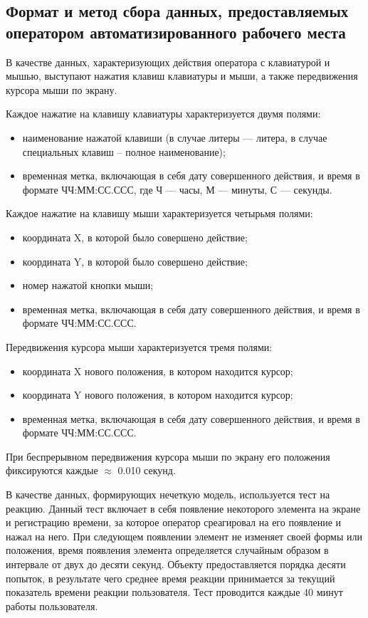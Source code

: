 \subsection{Формат и метод сбора данных, предоставляемых оператором автоматизированного рабочего места}
В качестве данных, характеризующих действия оператора с клавиатурой и мышью, выступают нажатия клавиш клавиатуры и мыши, а также передвижения курсора мыши по экрану.

Каждое нажатие на клавишу клавиатуры характеризуется двумя полями:
\begin{itemize}[leftmargin=1.6\parindent]
\item наименование нажатой клавиши (в случае литеры --- литера, в случае специальных клавиш -- полное наименование);
\item временная метка, включающая в себя дату совершенного действия, и время в формате ЧЧ:ММ:СС.ССС, где Ч --- часы, М --- минуты, С --- секунды.
\end{itemize}

Каждое нажатие на клавишу мыши характеризуется четырьмя полями:
\begin{itemize}[leftmargin=1.6\parindent]
\item координата X, в которой было совершено действие;
\item координата Y, в которой было совершено действие;
\item номер нажатой кнопки мыши;
\item временная метка, включающая в себя дату совершенного действия, и время в формате ЧЧ:ММ:СС.ССС.
\end{itemize}

Передвижения курсора мыши характеризуется тремя полями:
\begin{itemize}[leftmargin=1.6\parindent]
\item координата X нового положения, в котором находится курсор;
\item координата Y нового положения, в котором находится курсор;
\item временная метка, включающая в себя дату совершенного действия, и время в формате ЧЧ:ММ:СС.ССС.
\end{itemize}

При беспрерывном передвижения курсора мыши по экрану его положения фиксируются каждые $\approx$ 0.010 секунд.

В качестве данных, формирующих нечеткую модель, используется тест на реакцию. Данный тест включает в себя появление некоторого элемента на экране и регистрацию времени, за которое оператор среагировал на его появление и нажал на него. При следующем появлении элемент не изменяет своей формы или положения, время появления элемента определяется случайным образом в интервале от двух до десяти секунд. Объекту предоставляется порядка десяти попыток, в результате чего среднее время реакции принимается за текущий показатель времени реакции пользователя. Тест проводится каждые 40 минут работы пользователя.

